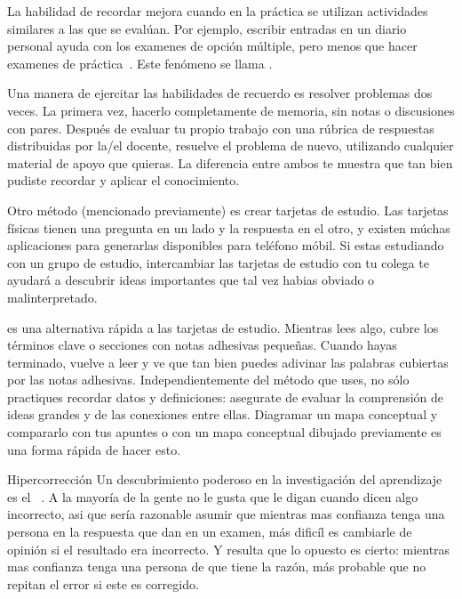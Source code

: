 La habilidad de recordar mejora cuando en la práctica se utilizan actividades similares a las que se evalúan.
Por ejemplo,
escribir entradas en un diario personal ayuda con los examenes de opción múltiple,
pero menos que hacer examenes de práctica~\cite{Mill2016a}.
Este fenómeno se llama
.

Una manera de ejercitar las habilidades de recuerdo es resolver problemas dos veces.
La primera vez,
hacerlo completamente de memoria, sin notas o discusiones con pares.
Después de evaluar tu propio trabajo con una rúbrica de respuestas distribuidas por la/el docente,
resuelve el problema de nuevo, utilizando cualquier material de apoyo que quieras.
La diferencia entre ambos te muestra que tan bien pudiste recordar y aplicar el conocimiento.

Otro método (mencionado previamente) es crear tarjetas de estudio.
Las tarjetas físicas tienen una pregunta en un lado y la respuesta en el otro,
y existen múchas aplicaciones para generarlas disponibles para teléfono móbil.
Si estas estudiando con un grupo de estudio,
intercambiar las tarjetas de estudio con tu colega
te ayudará a descubrir ideas importantes que tal vez habias obviado o malinterpretado.

es una alternativa rápida a las tarjetas de estudio.
Mientras lees algo,
cubre los términos clave o secciones con notas adhesivas pequeñas.
Cuando hayas terminado,
vuelve a leer y ve que tan bien puedes adivinar las palabras cubiertas por las notas adhesivas.
Independientemente del método que uses,
no sólo practiques recordar datos y definiciones:
asegurate de evaluar la comprensión de ideas grandes
y de las conexiones entre ellas.
Diagramar un mapa conceptual y compararlo con tus apuntes
o con un mapa conceptual dibujado previamente
es una forma rápida de hacer esto.

\begin{aside}{Hipercorrección}
    Un descubrimiento poderoso en la investigación del aprendizaje es
  el ~\cite{Metc2016}.
  A la mayoría de la gente no le gusta que le digan cuando dicen algo incorrecto,
  asi que sería razonable asumir que
  mientras mas confianza tenga una persona en la respuesta que dan en un examen,
  más dificíl es cambiarle de opinión si el resultado era incorrecto.
  Y resulta que lo opuesto es cierto:
  mientras mas confianza tenga una persona de que tiene la razón,
  más probable que no repitan el error si este es corregido.
\end{aside}

